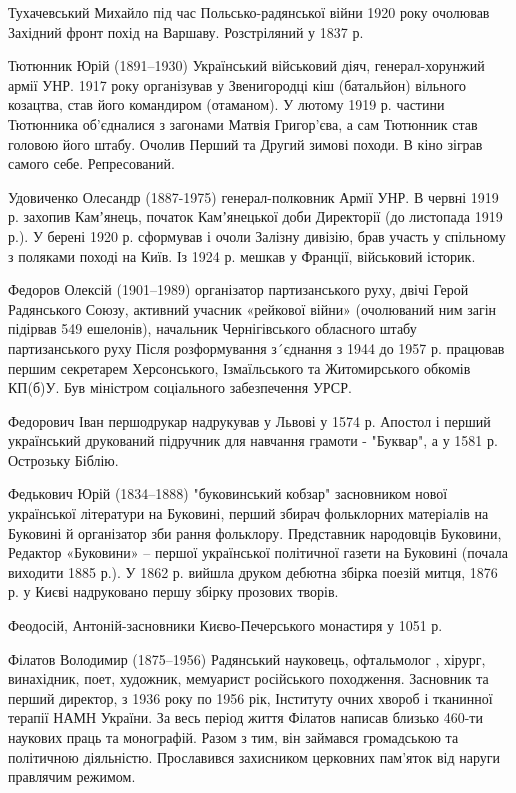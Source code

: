 Тухачевський Михайло під час Польсько-радянської війни 1920 року очолював Західний фронт похід на Варшаву. Розстріляний у 1837 р.

Тютюнник Юрій (1891–1930) Український військовий діяч, генерал-хорунжий армії УНР. 1917 року організував у Звенигородці кіш (батальйон) вільного козацтва, став його командиром (отаманом). У лютому 1919 р. частини Тютюнника об’єдналися з загонами Матвія Григор’єва, а сам Тютюнник став головою його штабу. Очолив Перший та Другий зимові походи. В кіно зіграв самого себе. Репресований.

Удовиченко Олесандр (1887-1975) генерал-полковник Армії УНР.  В червні 1919 р. захопив Камʼянець, початок Камʼянецької доби Директорії (до листопада 1919 р.).  У берені 1920 р. сформував і очоли Залізну дивізію, брав участь у спільному з поляками поході на Київ. Із 1924 р. мешкав у Франції, військовий історик.

 Федоров Олексій (1901–1989) організатор партизанського руху, двічі Герой Радянського Союзу, активний учасник «рейкової війни» (очолюваний ним загін підірвав 549 ешелонів), начальник Чернігівського обласного штабу партизанського руху Після розформування з´єднання з 1944 до 1957 р. працював першим секретарем Херсонського, Ізмаїльського та Житомирського обкомів КП(б)У. Був міністром соціального забезпечення УРСР.

Федорович Іван  першодрукар надрукував у Львові у 1574 р. Апостол і перший український друкований підручник для навчання грамоти - "Буквар", а у 1581 р. Острозьку Біблію.

Федькович Юрій  (1834–1888) "буковинський кобзар" засновником нової української літератури на Буковині, перший збирач фольклорних матеріалів на Буковині й організатор зби рання фольклору. Представник народовців Буковини, Редактор «Буковини» – першої української політичної газети на Буковині (почала виходити 1885 р.). У 1862 р. вийшла друком дебютна збірка поезій митця, 1876 р. у Києві надруковано першу збірку прозових творів.

Феодосій, Антоній-засновники Києво-Печерського монастиря у 1051 р.

Філатов Володимир (1875–1956) Радянський науковець, офтальмолог , хірург, винахідник, поет, художник, мемуарист російського походження. Засновник та перший директор, з 1936 року по 1956 рік, Інституту очних хвороб і тканинної терапії НАМН України. За весь період життя Філатов написав близько 460-ти наукових праць та монографій. Разом з тим, він займався громадською та політичною діяльністю. Прославився захисником церковних пам’яток від наруги правлячим режимом.

